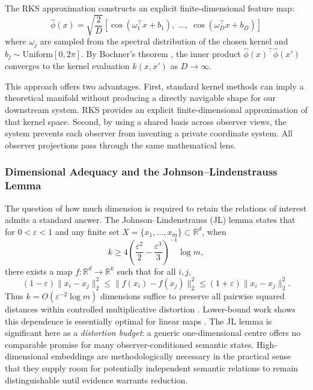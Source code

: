 The RKS approximation constructs an explicit finite-dimensional feature map:
\begin{equation}
    \hat{\phi}(x) = \sqrt{\frac{2}{D}}\left[\cos(\omega_1^\top x + b_1),\; \ldots,\; \cos(\omega_D^\top x + b_D)\right]
\end{equation}
where $\omega_j$ are sampled from the spectral distribution of the chosen kernel and $b_j \sim \mathrm{Uniform}[0, 2\pi]$. By Bochner's theorem \citep{bochner1933}, the inner product $\hat{\phi}(x)^\top \hat{\phi}(x')$ converges to the kernel evaluation $k(x, x')$ as $D \to \infty$.

This approach offers two advantages. First, standard kernel methods can imply a theoretical manifold without producing a directly navigable shape for our downstream system. RKS provides an explicit finite-dimensional approximation of that kernel space. Second, by using a shared basis across observer views, the system prevents each observer from inventing a private coordinate system. All observer projections pass through the same mathematical lens.

\subsubsection{Dimensional Adequacy and the Johnson--Lindenstrauss Lemma}

The question of how much dimension is required to retain the relations of interest admits a standard answer. The Johnson--Lindenstrauss (JL) lemma states that for $0 < \varepsilon < 1$ and any finite set $X = \{x_1, \ldots, x_m\} \subset \mathbb{R}^d$, when
\begin{equation}
    k \geq 4\left(\frac{\varepsilon^2}{2} - \frac{\varepsilon^3}{3}\right)^{-1}\log m,
\end{equation}
there exists a map $f\colon \mathbb{R}^d \to \mathbb{R}^k$ such that for all $i, j$,
\begin{equation}
    (1 - \varepsilon)\|x_i - x_j\|_2^2 \leq \|f(x_i) - f(x_j)\|_2^2 \leq (1 + \varepsilon)\|x_i - x_j\|_2^2.
\end{equation}
Thus $k = O(\varepsilon^{-2} \log m)$ dimensions suffice to preserve all pairwise squared distances within controlled multiplicative distortion \citep{johnsonlindenstrauss1984, dasguptagupta2003}. Lower-bound work shows this dependence is essentially optimal for linear maps \citep{larsennelson2016}. The JL lemma is significant here as a \emph{distortion budget}: a generic one-dimensional centre offers no comparable promise for many observer-conditioned semantic states. High-dimensional embeddings are methodologically necessary in the practical sense that they supply room for potentially independent semantic relations to remain distinguishable until evidence warrants reduction.

